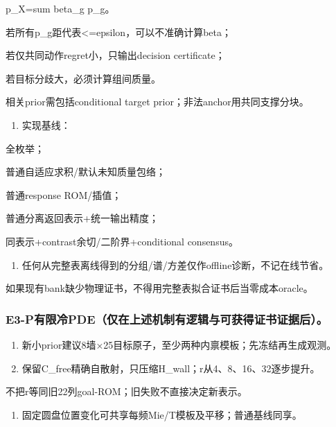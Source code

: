 \documentclass[
  10pt,
  a4paper,
]{article}
\providecommand{\tightlist}{%
  \setlength{\itemsep}{0pt}\setlength{\parskip}{0pt}}
\providecommand{\tightlist}{\setlength{\itemsep}{1pt}\setlength{\parskip}{1pt}}
\begin{document}
p\_X=sum beta\_g p\_g。

若所有p\_g距代表\textless=epsilon，可以不准确计算beta；

若仅共同动作regret小，只输出decision certificate；

若目标分歧大，必须计算组间质量。

相关prior需包括conditional target prior；非法anchor用共同支撑分块。

\begin{enumerate}
\def\labelenumi{\arabic{enumi}.}
\setcounter{enumi}{5}
\tightlist
\item
  实现基线：
\end{enumerate}

全枚举；

普通自适应求积/默认未知质量包络；

普通response ROM/插值；

普通分离返回表示+统一输出精度；

同表示+contrast余切/二阶界+conditional consensus。

\begin{enumerate}
\def\labelenumi{\arabic{enumi}.}
\setcounter{enumi}{6}
\tightlist
\item
  任何从完整表离线得到的分组/谱/方差仅作offline诊断，不记在线节省。
\end{enumerate}

如果现有bank缺少物理证书，不得用完整表拟合证书后当零成本oracle。

\hypertarget{e3-pux6709ux9650ux51b7pdeux4ec5ux5728ux4e0aux8ff0ux673aux5236ux6709ux903bux8f91ux4e0eux53efux83b7ux5f97ux8bc1ux4e66ux8bc1ux636eux540e}{%
\subsubsection{E3-P有限冷PDE（仅在上述机制有逻辑与可获得证书证据后）。}\label{e3-pux6709ux9650ux51b7pdeux4ec5ux5728ux4e0aux8ff0ux673aux5236ux6709ux903bux8f91ux4e0eux53efux83b7ux5f97ux8bc1ux4e66ux8bc1ux636eux540e}}

\begin{enumerate}
\def\labelenumi{\arabic{enumi}.}
\item
  新小prior建议8墙×25目标原子，至少两种内禀模板；先冻结再生成观测。
\item
  保留C\_free精确自散射，只压缩H\_wall；r从4、8、16、32逐步提升。
\end{enumerate}

不把r等同旧22列goal-ROM；旧失败不直接决定新表示。

\begin{enumerate}
\def\labelenumi{\arabic{enumi}.}
\setcounter{enumi}{2}
\tightlist
\item
  固定圆盘位置变化可共享每频Mie/T模板及平移；普通基线同享。
\end{enumerate}
\end{document}
